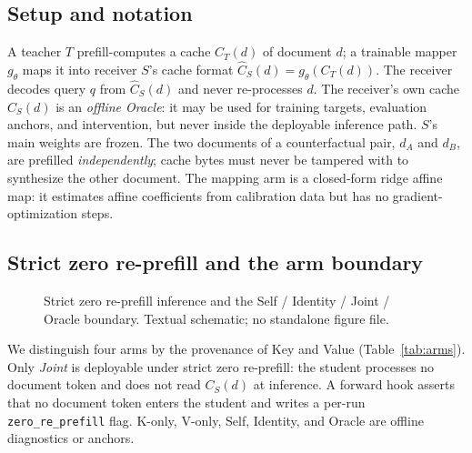 \documentclass[11pt,a4paper]{article}
\begin{document}
\subsection{Setup and notation}
\label{sec:proposed}

A teacher $T$ prefill-computes a cache $C_T(d)$ of document $d$; a trainable
mapper $g_\theta$ maps it into receiver $S$'s cache format
$\hat{C}_S(d)=g_\theta(C_T(d))$. The receiver decodes query $q$ from
$\hat{C}_S(d)$ and never re-processes $d$. The receiver's own cache $C_S(d)$ is
an \emph{offline Oracle}: it may be used for training targets, evaluation
anchors, and intervention, but never inside the deployable inference path.
$S$'s main weights are frozen. The two documents of a counterfactual pair,
$d_A$ and $d_B$, are prefilled \emph{independently}; cache bytes must never be
tampered with to synthesize the other document. The mapping arm is a
closed-form ridge affine map: it estimates affine coefficients from calibration
data but has no gradient-optimization steps.

\subsection{Strict zero re-prefill and the arm boundary}
\label{sec:zerore}

\begin{figure}[t]
\centering
{}
\caption{Strict zero re-prefill inference and the Self / Identity / Joint /
Oracle boundary. Textual schematic; no standalone figure file.}
\label{fig:f2}
\end{figure}

We distinguish four arms by the provenance of Key and Value
(Table~\ref{tab:arms}). Only \emph{Joint} is deployable under strict zero
re-prefill: the student processes no document token and does not read $C_S(d)$
at inference. A forward hook asserts that no document token enters the student
and writes a per-run \texttt{zero\_re\_prefill} flag. K-only, V-only, Self,
Identity, and Oracle are offline diagnostics or anchors.
\end{document}
